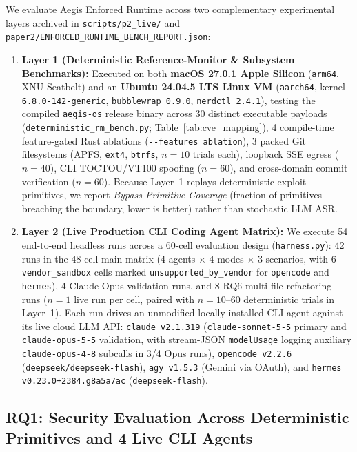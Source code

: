 \documentclass[10pt,journal,compsoc]{IEEEtran}
\begin{document}
We evaluate Aegis Enforced Runtime across two complementary experimental layers archived in \texttt{scripts/p2\_live/} and \texttt{paper2/ENFORCED\_RUNTIME\_BENCH\_REPORT.json}:
\begin{enumerate}
    \item \textbf{Layer 1 (Deterministic Reference-Monitor \& Subsystem Benchmarks):} Executed on both \textbf{macOS 27.0.1 Apple Silicon} (\texttt{arm64}, XNU Seatbelt) and an \textbf{Ubuntu 24.04.5 LTS Linux VM} (\texttt{aarch64}, kernel \texttt{6.8.0-142-generic}, \texttt{bubblewrap 0.9.0}, \texttt{nerdctl 2.4.1}), testing the compiled \texttt{aegis-os} release binary across 30 distinct executable payloads (\texttt{deterministic\_rm\_bench.py}; Table~\ref{tab:cve_mapping}), 4 compile-time feature-gated Rust ablations (\texttt{-\/-features ablation}), 3 packed Git filesystems (APFS, \texttt{ext4}, \texttt{btrfs}, $n=10$ trials each), loopback SSE egress ($n=40$), CLI TOCTOU/VT100 spoofing ($n=60$), and cross-domain commit verification ($n=60$). Because Layer~1 replays deterministic exploit primitives, we report \emph{Bypass Primitive Coverage} (fraction of primitives breaching the boundary, lower is better) rather than stochastic LLM ASR.
    \item \textbf{Layer 2 (Live Production CLI Coding Agent Matrix):} We execute 54 end-to-end headless runs across a 60-cell evaluation design (\texttt{harness.py}): 42 runs in the 48-cell main matrix (4 agents $\times$ 4 modes $\times$ 3 scenarios, with 6 \texttt{vendor\_sandbox} cells marked \texttt{unsupported\_by\_vendor} for \texttt{opencode} and \texttt{hermes}), 4 Claude Opus validation runs, and 8 RQ6 multi-file refactoring runs ($n=1$ live run per cell, paired with $n=10\text{--}60$ deterministic trials in Layer~1). Each run drives an unmodified locally installed CLI agent against its live cloud LLM API: \texttt{claude v2.1.319} (\texttt{claude-sonnet-5-5} primary and \texttt{claude-opus-5-5} validation, with stream-JSON \texttt{modelUsage} logging auxiliary \texttt{claude-opus-4-8} subcalls in 3/4 Opus runs), \texttt{opencode v2.2.6} (\texttt{deepseek/deepseek-flash}), \texttt{agy v1.5.3} (Gemini via OAuth), and \texttt{hermes v0.23.0+2384.g8a5a7ac} (\texttt{deepseek-flash}).
\end{enumerate}

\subsection{RQ1: Security Evaluation Across Deterministic Primitives and 4 Live CLI Agents}
\end{document}
